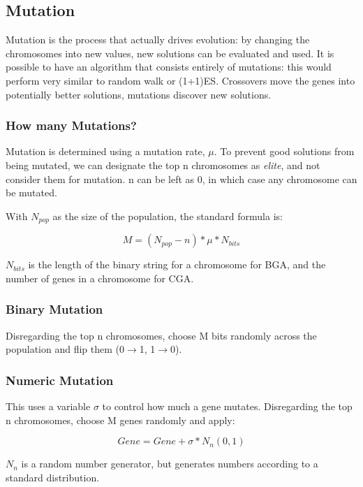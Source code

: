 \subsection{Mutation}
Mutation is the process that actually drives evolution: by changing the chromosomes into new values, new solutions can be evaluated and used. It is possible to have an algorithm that consists entirely of mutations: this would perform very similar to random walk or (1+1)ES. Crossovers move the genes into potentially better solutions, mutations discover new solutions. 

\subsubsection{How many Mutations?}
Mutation is determined using a mutation rate, $\mu$. To prevent good solutions from being mutated, we can designate the top n chromosomes as \emph{elite}, and not consider them for mutation. n can be left as 0, in which case any chromosome can be mutated. 

With $N_{pop}$ as the size of the population, the standard formula is:

\begin{equation}
    M = (N_{pop} - n) * \mu * N_{bits}
\end{equation}

$N_{bits}$ is the length of the binary string for a chromosome for BGA, and the number of genes in a chromosome for CGA.

\subsubsection{Binary Mutation}
Disregarding the top n chromosomes, choose M bits randomly across the population and flip them (0$\rightarrow$1, 1$\rightarrow$0). 

\subsubsection{Numeric Mutation}
This uses a variable $\sigma$ to control how much a gene mutates. Disregarding the top n chromosomes, choose M genes randomly and apply:

\[
    Gene = Gene + \sigma * N_n(0,1)
\]

$N_n$ is a random number generator, but generates numbers according to a standard distribution. 